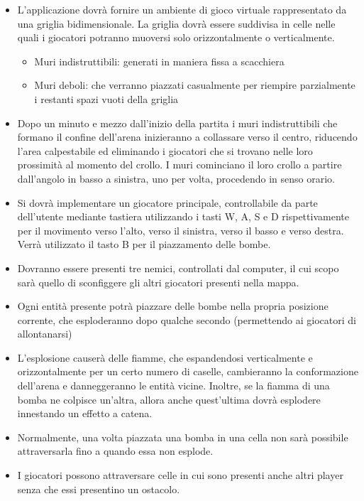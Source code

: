 \documentclass[a4paper,12pt]{report}
\begin{document}
\begin{itemize}
	\item L'applicazione dovrà fornire un ambiente di gioco virtuale rappresentato da una griglia bidimensionale. La griglia dovrà essere suddivisa in celle nelle quali i giocatori potranno muoversi solo orizzontalmente o verticalmente.
            \begin{itemize}La griglia verrà riempita da due tipologie di ostacoli:
                \item Muri indistruttibili: generati in maniera fissa a scacchiera
                \item Muri deboli: che verranno piazzati casualmente per riempire parzialmente i restanti spazi vuoti della griglia
            \end{itemize}
	\item Dopo un minuto e mezzo dall’inizio della partita i muri indistruttibili che formano il confine dell’arena inizieranno a collassare verso il centro, riducendo l’area calpestabile ed eliminando i giocatori che si trovano nelle loro prossimità al momento del crollo. I muri cominciano il loro crollo a partire dall’angolo in basso a sinistra, uno per volta, procedendo in senso orario.
	\item Si dovrà implementare un giocatore principale, controllabile da parte dell’utente mediante tastiera utilizzando i tasti W, A, S e D rispettivamente per il movimento verso l’alto, verso il sinistra, verso il basso e verso destra. Verrà utilizzato il tasto B per il piazzamento delle bombe.
	\item Dovranno essere presenti tre nemici, controllati dal computer, il cui scopo sarà quello di sconfiggere gli altri giocatori presenti nella mappa.
	\item Ogni entità presente potrà piazzare delle bombe nella propria posizione corrente, che esploderanno dopo qualche secondo (permettendo ai giocatori di allontanarsi)
        \item L’esplosione causerà delle fiamme, che espandendosi verticalmente e orizzontalmente per un certo numero di caselle, cambieranno la conformazione dell’arena e danneggeranno le entità vicine. Inoltre, se la fiamma di una bomba ne colpisce un’altra, allora anche quest'ultima dovrà esplodere innestando un effetto a catena.
        \item Normalmente, una volta piazzata una bomba in una cella non sarà possibile attraversarla fino a quando essa non esplode. 
        \item I giocatori possono attraversare celle in cui sono presenti anche altri player senza che essi presentino un ostacolo.

\end{itemize}
\end{document}
